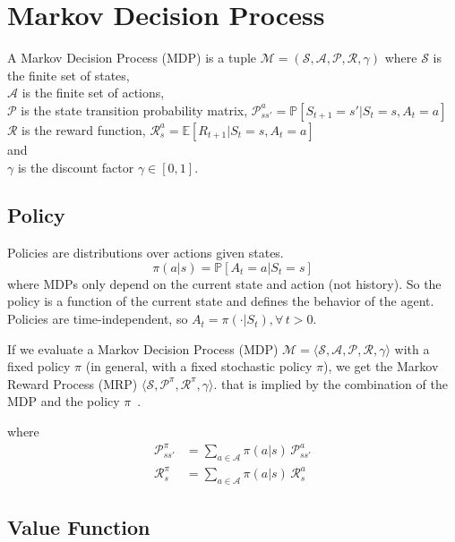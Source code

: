 \section{Markov Decision Process}\label{sec:markov-decision-process2}
\begin{definition}
    A Markov Decision Process (MDP) is a tuple $\mathcal{M}=(\mathcal{S},\mathcal{A},\mathcal{P},\mathcal{R},\gamma)$
    where
    $\mathcal{S}$ is the finite set of states, \\
    $\mathcal{A}$ is the finite set of actions, \\
    $\mathcal{P}$ is the state transition probability matrix,
    $\mathcal{P}_{ss'}^{a}=\mathbb{P}[S_{t+1}=s'|S_t=s,A_t=a]$\\
    $\mathcal{R}$ is the reward function, $\mathcal{R}_{s}^{a}=\mathbb{E}[R_{t+1}|S_t=s,A_t=a]$ \\
    and  \\
    $\gamma$ is the discount factor $\gamma\in[0,1]$. \\
\end{definition} %

\subsection{Policy}\label{subsec:policy}
Policies are distributions over actions given states.
\[
    \pi(a|s) = \mathbb{P}[A_t=a|S_t=s]
\]
where MDPs only depend on the current state and action (not history).
So the policy is a function of the current state and defines
the behavior of the agent.
Policies are time-independent, so $A_t=\pi(\cdot|S_t),\forall\,t>0$.


If we evaluate a Markov Decision Process (MDP)
$\mathcal{M}=\langle\mathcal{S},\mathcal{A},\mathcal{P},\mathcal{R},\gamma\rangle$
with a fixed policy $\pi$ (in general, with a fixed stochastic policy $\pi$), we get the
Markov Reward Process (MRP) $\langle \mathcal{S},\mathcal{P}^{\pi},\mathcal{R}^{\pi},\gamma\rangle$.
that is implied by the combination of the MDP and the
policy $\pi$~\cite[100]{rao2022foundations}.

where
\begin{align}
    \mathcal{P}^{\pi}_{ss'} &= \sum_{a\in\mathcal{A}}^{}\pi(a|s)\,\mathcal{P}_{ss'}^{a} \\
    \mathcal{R}^{\pi}_{s} &= \sum_{a\in\mathcal{A}}^{}\pi(a|s)\,\mathcal{R}_{s}^{a}
\end{align}

\subsection{Value Function}\label{subsec:value-function}

